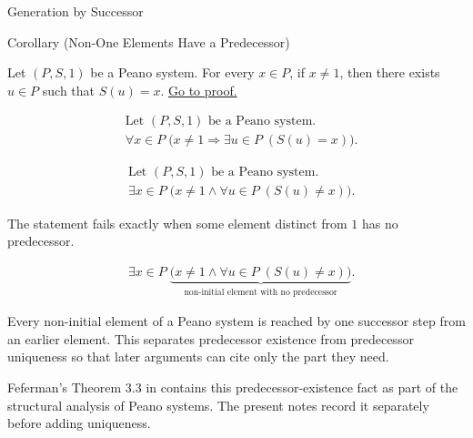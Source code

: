 \begin{topicbox}{Generation by Successor}
\begin{corollarybox}{Corollary (Non-One Elements Have a Predecessor)}
\begin{corollary}
\label{cor:non-one-elements-have-a-predecessor}
Let $(P,S,1)$ be a Peano system. For every $x \in P$, if $x \neq 1$, then
there exists $u \in P$ such that $S(u)=x$.
\hyperref[prf:non-one-elements-have-a-predecessor]{Go to proof.}
\end{corollary}
\end{corollarybox}

\begin{remark*}
\[
\begin{aligned}
&\text{Let } (P,S,1) \text{ be a Peano system.}\\
&\forall x \in P\;\bigl(x\neq 1 \Longrightarrow
\exists u \in P\;(S(u)=x)\bigr).
\end{aligned}
\]
\end{remark*}

\begin{remark*}
\[
\begin{aligned}
&\text{Let } (P,S,1) \text{ be a Peano system.}\\
&\exists x \in P\;\bigl(x\neq 1 \land
\forall u \in P\;(S(u)\neq x)\bigr).
\end{aligned}
\]
\end{remark*}

\begin{remark*}
The statement fails exactly when some element distinct from $1$ has no
predecessor.
\end{remark*}

\begin{remark*}
\[
\begin{aligned}
&\exists x \in P\;
\underbrace{\bigl(x\neq 1 \land
\forall u \in P\;(S(u)\neq x)\bigr)}_{\text{non-initial element with no predecessor}}.
\end{aligned}
\]
\end{remark*}

\begin{remark*}[Interpretation]
Every non-initial element of a Peano system is reached by one successor step
from an earlier element. This separates predecessor existence from predecessor
uniqueness so that later arguments can cite only the part they need.
\end{remark*}

\begin{remark*}
Feferman's Theorem 3.3 in \citet{FefermanNumberSystems1964} contains this
predecessor-existence fact as part of the structural analysis of Peano systems.
The present notes record it separately before adding uniqueness.
\end{remark*}


\end{topicbox}
